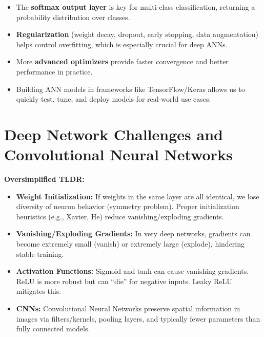 \documentclass{article}
\begin{document}
\begin{itemize}
    \item The \textbf{softmax output layer} is key for multi-class classification, returning a probability distribution over classes.
    \item \textbf{Regularization} (weight decay, dropout, early stopping, data augmentation) helps control overfitting, which is especially crucial for deep ANNs.
    \item More \textbf{advanced optimizers} provide faster convergence and better performance in practice.
    \item Building ANN models in frameworks like TensorFlow/Keras allows us to quickly test, tune, and deploy models for real-world use cases.
\end{itemize}

\section{Deep Network Challenges and Convolutional Neural Networks}

\textbf{Oversimplified TLDR:}
\begin{itemize}
    \item \textbf{Weight Initialization:} If weights in the same layer are all identical, we lose diversity of neuron behavior (symmetry problem). Proper initialization heuristics (e.g., Xavier, He) reduce vanishing/exploding gradients.
    \item \textbf{Vanishing/Exploding Gradients:} In very deep networks, gradients can become extremely small (vanish) or extremely large (explode), hindering stable training.
    \item \textbf{Activation Functions:} Sigmoid and tanh can cause vanishing gradients. ReLU is more robust but can ``die'' for negative inputs. Leaky ReLU mitigates this.
    \item \textbf{CNNs:} Convolutional Neural Networks preserve spatial information in images via filters/kernels, pooling layers, and typically fewer parameters than fully connected models.
\end{itemize}
\end{document}
